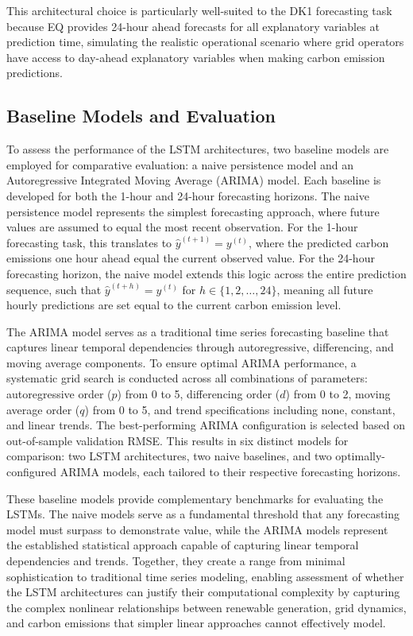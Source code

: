 This architectural choice is particularly well-suited to the DK1 forecasting task because EQ provides 24-hour ahead forecasts for all explanatory variables at prediction time, simulating the realistic operational scenario where grid operators have access to day-ahead explanatory variables when making carbon emission predictions.

\subsection{Baseline Models and Evaluation}

To assess the performance of the LSTM architectures, two baseline models are employed for comparative evaluation: a naive persistence model and an Autoregressive Integrated Moving Average (ARIMA) model. Each baseline is developed for both the 1-hour and 24-hour forecasting horizons. The naive persistence model represents the simplest forecasting approach, where future values are assumed to equal the most recent observation. For the 1-hour forecasting task, this translates to \(\hat{y}^{(t+1)} = y^{(t)}\), where the predicted carbon emissions one hour ahead equal the current observed value. For the 24-hour forecasting horizon, the naive model extends this logic across the entire prediction sequence, such that \(\hat{y}^{(t+h)} = y^{(t)}\) for \(h \in \{1, 2, \ldots, 24\}\), meaning all future hourly predictions are set equal to the current carbon emission level.

The ARIMA model serves as a traditional time series forecasting baseline that captures linear temporal dependencies through autoregressive, differencing, and moving average components. To ensure optimal ARIMA performance, a systematic grid search is conducted across all combinations of parameters: autoregressive order (\(p\)) from 0 to 5, differencing order (\(d\)) from 0 to 2, moving average order (\(q\)) from 0 to 5, and trend specifications including none, constant, and linear trends. The best-performing ARIMA configuration is selected based on out-of-sample validation RMSE. This results in six distinct models for comparison: two LSTM architectures, two naive baselines, and two optimally-configured ARIMA models, each tailored to their respective forecasting horizons.

These baseline models provide complementary benchmarks for evaluating the LSTMs. The naive models serve as a fundamental threshold that any forecasting model must surpass to demonstrate value, while the ARIMA models represent the established statistical approach capable of capturing linear temporal dependencies and trends. Together, they create a range from minimal sophistication to traditional time series modeling, enabling assessment of whether the LSTM architectures can justify their computational complexity by capturing the complex nonlinear relationships between renewable generation, grid dynamics, and carbon emissions that simpler linear approaches cannot effectively model.

